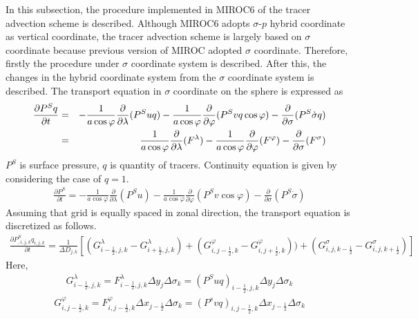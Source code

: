 In this subsection, the procedure implemented in MIROC6 of the tracer advection scheme is described. Although MIROC6 adopts \(\sigma\)-\(p\) hybrid coordinate as vertical coordinate, the tracer
advection scheme is largely based on \(\sigma\) coordinate because previous version of MIROC adopted \(\sigma\) coordinate. Therefore, firstly the procedure under \(\sigma\) coordinate system is
described. After this, the changes in the hybrid coordinate system from the \(\sigma\) coordinate system is described. The transport equation in \(\sigma\) coordinate on the sphere is expressed as \begin{eqnarray}
  \label{b1}
  \frac{\partial P^{S} q}{\partial t} &=& - \frac{1}{a \cos \varphi} \frac{\partial}{\partial \lambda}(P^{S} uq)- \frac{1}{a \cos \varphi} \frac{\partial}{\partial \varphi}(P^{S} vq \cos \varphi)- \frac{\partial}{\partial \sigma} (P^{S} \dot{\sigma} q)\notag\\
  &=& \frac{1}{a \cos \varphi} \frac{\partial}{\partial \lambda}(F^{\lambda})- \frac{1}{a \cos \varphi} \frac{\partial}{\partial \varphi}(F^{\varphi})- \frac{\partial}{\partial \sigma} (F^{\sigma})\end{eqnarray}
\(P^{S}\) is surface pressure, \(q\) is quantity of tracers. Continuity equation is given by considering the case of \(q=1\).
\begin{eqnarray}\frac{\partial P^{S}}{\partial t} = - \frac{1}{a \cos \varphi} \frac{\partial}{\partial \lambda}(P^{S}u)- \frac{1}{a \cos \varphi} \frac{\partial}{\partial \varphi}(P^{S}v \cos \varphi)- \frac{\partial}{\partial \sigma} (P^{S} \dot{\sigma})\end{eqnarray}
Assuming that grid is equally spaced in zonal direction, the transport equation is discretized as follows. \begin{eqnarray}\label{a1}
  \frac{\partial P^{S}_{,i,j,k} q_{i,j,k}}{\partial t}=\frac{1}{\Delta D_{j,k}}[(G^{\lambda}_{i-\frac{1}{2},j,k}-G^{\lambda}_{i+\frac{1}{2},j,k})+(G^{\varphi}_{i,j-\frac{1}{2},k}-G^{\varphi}_{i,j+\frac{1}{2},k}))+(G^{\sigma}_{i,j,k-\frac{1}{2}}-G^{\sigma}_{i,j,k+\frac{1}{2}})]\end{eqnarray}
Here, \begin{eqnarray}G^{\lambda}_{i-\frac{1}{2},j,k}=F^{\lambda}_{i-\frac{1}{2},j,k} \Delta y_{j} \Delta \sigma_{k}=(P^{S}uq)_{i-\frac{1}{2},j,k} \Delta y_{j} \Delta \sigma_{k}\end{eqnarray}
\begin{eqnarray}G^{\varphi}_{i,j-\frac{1}{2},k}=F^{\varphi}_{i,j-\frac{1}{2},k} \Delta x_{j-\frac{1}{2}} \Delta \sigma_{k}=(P^{s}vq)_{i,j-\frac{1}{2},k} \Delta x_{j-\frac{1}{2}} \Delta \sigma_{k}\end{eqnarray}

